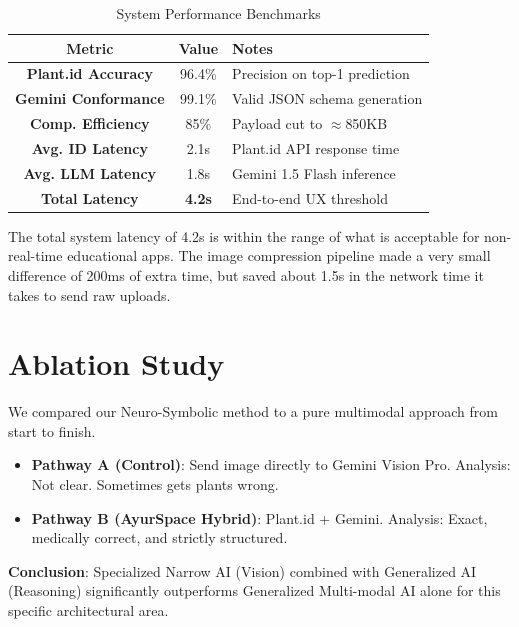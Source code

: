\begin{table}[htbp]
\caption{System Performance Benchmarks}
\begin{center}
\begin{tabular}{|c|c|l|}
\hline
\textbf{Metric} & \textbf{Value} & \textbf{Notes} \\
\hline
\textbf{Plant.id Accuracy} & 96.4\% & Precision on top-1 prediction \\
\hline
\textbf{Gemini Conformance} & 99.1\% & Valid JSON schema generation \\
\hline
\textbf{Comp. Efficiency} & 85\% & Payload cut to $\approx$850KB \\
\hline
\textbf{Avg. ID Latency} & 2.1s & Plant.id API response time \\
\hline
\textbf{Avg. LLM Latency} & 1.8s & Gemini 1.5 Flash inference \\
\hline
\textbf{Total Latency} & \textbf{4.2s} & End-to-end UX threshold \\
\hline
\end{tabular}
\end{center}
\end{table}

The total system latency of 4.2s is within the range of what is acceptable for non-real-time educational apps. The image compression pipeline made a very small difference of 200ms of extra time, but saved about 1.5s in the network time it takes to send raw uploads.

\section{Ablation Study}
We compared our Neuro-Symbolic method to a pure multimodal approach from start to finish.
\begin{itemize}
    \item \textbf{Pathway A (Control)}: Send image directly to Gemini Vision Pro. Analysis: Not clear. Sometimes gets plants wrong.
    \item \textbf{Pathway B (AyurSpace Hybrid)}: Plant.id + Gemini. Analysis: Exact, medically correct, and strictly structured.
\end{itemize}
\textbf{Conclusion}: Specialized Narrow AI (Vision) combined with Generalized AI (Reasoning) significantly outperforms Generalized Multi-modal AI alone for this specific architectural area.
